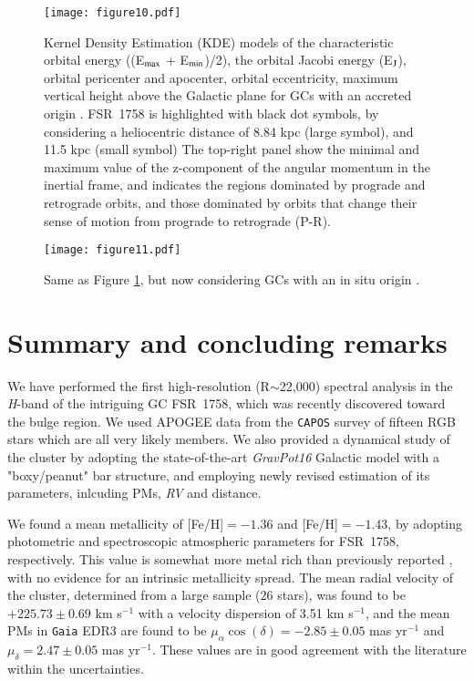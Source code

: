 \documentclass[longauth]{aa} %
\begin{document}
\begin{figure*}
	\begin{center}
		\texttt{[image: figure10.pdf]}
		\caption{Kernel Density Estimation (KDE) models of the characteristic orbital energy ((E$_{\rm max}$ + E$_{\rm min}$)/2), the orbital Jacobi energy (E$_{\rm J}$), orbital pericenter and apocenter, orbital eccentricity, maximum vertical height above the Galactic plane for GCs with an accreted origin \citep[e.g.,][]{Massari2019}. FSR~1758 is highlighted with black dot symbols, by considering a heliocentric distance of 8.84 kpc (large symbol), and 11.5 kpc (small symbol) The top-right panel show the minimal and maximum value of the z-component of the angular momentum in the inertial frame, and indicates the regions dominated by prograde and retrograde orbits, and those dominated by orbits that change their sense of motion from prograde to retrograde (P-R).} 
		\label{Figure5}
	\end{center}
\end{figure*}

\begin{figure*}
	\begin{center}
		\texttt{[image: figure11.pdf]}
		\caption{Same as Figure \ref{Figure5}, but now considering GCs with an in situ origin \citep{Massari2019}.} 
		\label{Figure7}
	\end{center}
\end{figure*}


\section{Summary and concluding remarks}
\label{section7}

We have performed the first high-resolution (R$\sim$22,000) spectral analysis in the \textit{H}-band of the intriguing GC FSR~1758, which was recently discovered toward the bulge region. We used APOGEE data from the \texttt{CAPOS} survey of fifteen RGB stars which are all very likely members.  We also provided a dynamical study of the cluster by adopting the state-of-the-art \textit{GravPot16} Galactic model with a "boxy/peanut" bar structure, and employing newly revised estimation of its parameters, inlcuding PMs, \textit{RV} and distance. 

We found a mean metallicity of [Fe/H]$=-1.36$ and [Fe/H]$=-1.43$, by adopting photometric and spectroscopic atmospheric parameters for FSR~1758, respectively. This value is somewhat more metal rich than previously reported \citep[see, e.g.,][]{Barba2019, Villanova2019}, with no evidence for an intrinsic metallicity spread. The mean radial velocity of the cluster, determined from a large sample (26 stars), was found to be $+225.73\pm0.69$ km s$^{-1}$ with a velocity dispersion of 3.51 km s$^{-1}$, and the mean PMs in \texttt{Gaia} EDR3 are found to be $\mu_{\alpha}\cos(\delta)=-2.85\pm0.05$ mas yr$^{-1}$ and $\mu_{\delta}=2.47\pm0.05$ mas yr$^{-1}$. These values are in good agreement with the literature within the uncertainties. 
\end{document}
